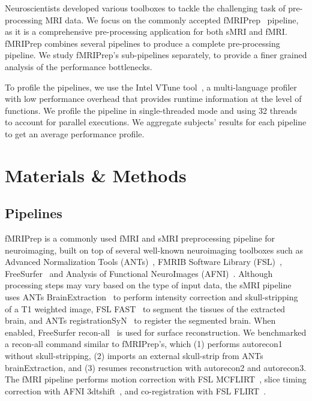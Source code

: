 \documentclass[conference]{IEEEtran}
\begin{document}
Neuroscientists developed various toolboxes to tackle the challenging task of pre-processing MRI data. We focus on the commonly accepted fMRIPrep~\cite{Esteban2019-bl} pipeline, as it is a comprehensive pre-processing application for both sMRI and fMRI. fMRIPrep combines several pipelines to produce a complete pre-processing pipeline. We study fMRIPrep's sub-pipelines separately, to provide a finer grained analysis of the performance bottlenecks.

To profile the pipelines, we use the Intel VTune tool~\cite{vtune-profiler}, a multi-language profiler with low performance overhead that provides runtime information at the level of functions. We profile the pipeline in single-threaded mode and using 32 threads to account for parallel executions. We aggregate subjects' results for each pipeline to get an average performance profile.

\section{Materials \& Methods}
\subsection{Pipelines}
fMRIPrep is a commonly used fMRI and sMRI preprocessing pipeline for neuroimaging, built on top of several well-known neuroimaging toolboxes such as Advanced Normalization Tools (ANTs)~\cite{Avants2020-xx}, FMRIB Software Library (FSL)~\cite{Jenkinson2012-tq}, FreeSurfer~\cite{Fischl2012-cx} and Analysis of Functional NeuroImages (AFNI)~\cite{Cox1996-nk}. Although processing steps may vary based on the type of input data, the sMRI pipeline uses ANTs BrainExtraction~\cite{Tustison2010-gg,Avants2008-ea} to perform intensity correction and skull-stripping of a T1 weighted image, FSL FAST~\cite{Zhang2001-hx} to segment the tissues of the extracted brain, and ANTs registrationSyN~\cite{Avants2008-ea} to register the segmented brain. When enabled, FreeSurfer recon-all~\cite{Dale1999-wu} is used for surface reconstruction. We benchmarked a recon-all command similar to fMRIPrep's, which (1) performs autorecon1 without skull-stripping, (2) imports an external skull-strip from ANTs brainExtraction, and (3) resumes reconstruction with autorecon2 and autorecon3. The fMRI pipeline performs motion correction with FSL MCFLIRT~\cite{Jenkinson2002-od}, slice timing correction with AFNI 3dtshift~\cite{Cox1996-nk}, and co-registration with FSL FLIRT~\cite{Jenkinson2002-od,Jenkinson2001-eu,Greve2009-dw}.
\end{document}
